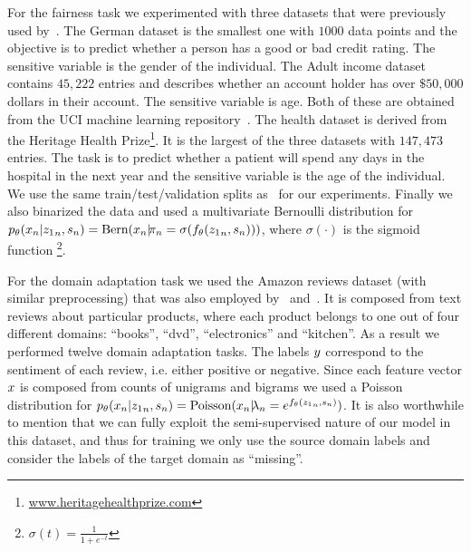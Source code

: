 For the fairness task we experimented with three datasets that were previously used by~\citet{zemel2013learning}. The German dataset is the smallest one with $1000$ data points and the objective is to predict whether a person has a good or bad credit rating. The sensitive variable is the gender of the individual. The Adult income dataset contains $45,222$ entries and describes whether an account holder has over $\$50,000$ dollars in their account. The sensitive variable is age. Both of these are obtained from the UCI machine learning repository~\citep{UCI}. The health dataset is derived from the Heritage Health Prize\footnote{\url{www.heritagehealthprize.com}}. It is the largest of the three datasets with $147,473$ entries. The task is to predict whether a patient will spend any days in the hospital in the next year and the sensitive variable is the age of the individual. We use the same train/test/validation splits as~\citet{zemel2013learning} for our experiments. Finally we also binarized the data and used a multivariate Bernoulli distribution for $p_\theta(\*x_n|{\*z_1}_n,\*s_n) = \text{Bern}(\*x_n | \!\pi_n = \sigma(f_\theta({\*z_1}_n, \*s_n)))$, where $\sigma(\cdot)$ is the sigmoid function \footnote{$\sigma(t) = \frac{1}{1 + e^{-t}}$}.

For the domain adaptation task we used the Amazon reviews dataset (with similar preprocessing) that was also employed by~\citet{chen2012marginalized} and~\citet{2015arXiv150507818G}. It is composed from text reviews about particular products, where each product belongs to one out of four different domains: ``books'', ``dvd'', ``electronics'' and ``kitchen''. As a result we performed twelve domain adaptation tasks. The labels $\*y$ correspond to the sentiment of each review, i.e. either positive or negative. Since each feature vector $\*x$ is composed from counts of unigrams and bigrams we used a Poisson distribution for $p_\theta(\*x_n|{\*z_1}_n, \*s_n) = \text{Poisson}(\*x_n | \!\lambda_n = e^{f_\theta({\*z_1}_n, \*s_n)})$. It is also worthwhile to mention that we can fully exploit the semi-supervised nature of our model in this dataset, and thus for training we only use the source domain labels and consider the labels of the target domain as ``missing''.

